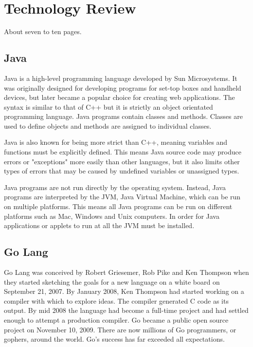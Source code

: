 
\chapter{Technology Review}
About seven to ten pages.





\section {Java}
Java is a high-level programming language developed by Sun Microsystems. It was originally designed for developing programs for set-top boxes and handheld devices, but later became a popular choice for creating web applications. The syntax is similar to that of C++ but it is strictly an object orientated programming language. Java programs contain classes and methods. Classes are used to define objects and methods are assigned to individual classes.\newline

Java is also known for being more strict than C++, meaning variables and functions must be explicitly defined. This means Java source code may produce errors or "exceptions" more easily than other languages, but it also limits other types of errors that may be caused by undefined variables or unassigned types.\newline

Java programs are not run directly by the operating system. Instead, Java programs are interpreted by the JVM, Java Virtual Machine, which can be run on multiple platforms. This means all Java programs can be run on different platforms such as Mac, Windows and Unix computers.  In order for Java applications or applets to run at all the JVM must be installed.\newline

\section {Go Lang}
Go Lang was conceived by Robert Griesemer, Rob Pike and Ken Thompson when they started sketching the goals for a new language on a white board on September 21, 2007. By January 2008, Ken Thompson had started working on a compiler with which to explore ideas. The compiler generated C code as its output. By mid 2008 the language had become a full-time project and had settled enough to attempt a production compiler. Go became a public open source project on November 10, 2009. There are now millions of Go programmers, or gophers, around the world. Go's success has far exceeded all expectations.\newline

